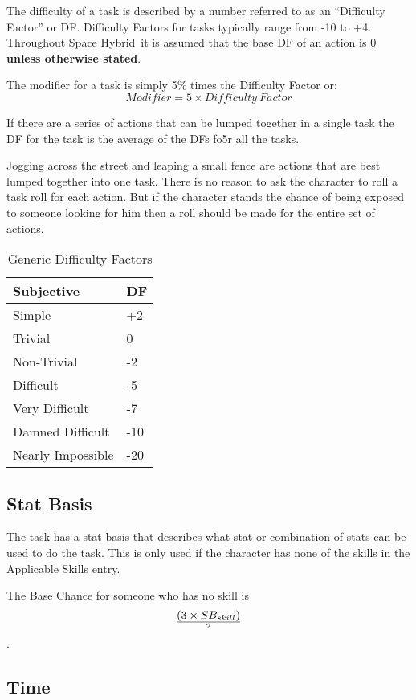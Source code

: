 The difficulty of a task is described by a number 
referred to as an ``Difficulty Factor'' or DF. Difficulty Factors 
for tasks typically range from -10  to +4. Throughout Space Hybrid\ it is 
assumed that the base DF of an action is 0 {\bf unless otherwise 
stated}. 

The modifier for a task is simply 5\% times the Difficulty Factor or:
\[ Modifier = 5 \times {Difficulty\ Factor} \]

If there are a series of actions that can be lumped 
together in a single task the DF for the task is the average of the DFs fo5r all the tasks.

Jogging across the street and leaping a small fence are actions that 
are best lumped together into one task. There is no reason 
to ask the character to roll a task roll for each action. 
But if the character stands the chance of being exposed to
someone looking for him then a roll should be made for the entire set 
of actions. 

\begin{table}[h]
	\begin{tabular}{l|l}
	Subjective						& DF \\
	\hline
    Simple			& +2 \\
	Trivial			&  0 \\
	Non-Trivial	 	&  -2 \\
	Difficult		&  -5 \\
	Very Difficult  & -7 \\ 
	Damned Difficult & -10 \\
   	Nearly Impossible & -20 \\
	\end{tabular}
    \caption{Generic Difficulty Factors}
\end{table}

\subsection{Stat Basis}

The task has a stat basis that describes what stat or combination of 
stats can be used to do the task. This is only used if the character 
has none of the skills in the Applicable Skills entry. 

The Base Chance for someone who has no skill is 
\[ (3 \times SB_{skill}) \over {2} \]. 

\subsection{Time}

